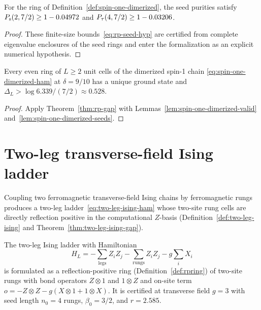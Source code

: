 \begin{lemma}
  \label{lem:spin-one-dimerized-seeds}
  \leanok
  For the ring of Definition~\ref{def:spin-one-dimerized}, the seed purities satisfy
  \(P_{\mathrm{s}}(2, 7/2) \ge 1 - 0.04972\) and \(P_{\tau}(4, 7/2) \ge 1 - 0.03206\).
\end{lemma}
\begin{proof}
  These finite-size bounds~\eqref{eq:rp-seed-hyp} are certified from complete eigenvalue enclosures
  of the seed rings and enter the formalization as an explicit numerical hypothesis.
\end{proof}

\begin{theorem}
  \label{thm:spin-one-dimerized-gap}
  \leanok
  Every even ring of \(L \ge 2\) unit cells of the dimerized spin-1 chain
  \eqref{eq:spin-one-dimerized-ham} at \(\delta = 9/10\) has a unique ground state and
  \(\Delta_L > \log 6.339 / (7/2) \approx 0.528\).
\end{theorem}
\begin{proof}
  \leanok
  Apply Theorem~\ref{thm:rp-gap} with Lemmas~\ref{lem:spin-one-dimerized-valid}
  and~\ref{lem:spin-one-dimerized-seeds}.
\end{proof}

\section{Two-leg transverse-field Ising ladder}

Coupling two ferromagnetic transverse-field Ising chains by ferromagnetic rungs produces a two-leg
ladder~\eqref{eq:two-leg-ising-ham} whose two-site rung cells are directly reflection positive in
the computational \(Z\)-basis (Definition~\ref{def:two-leg-ising} and
Theorem~\ref{thm:two-leg-ising-gap}).

\begin{definition}
  \label{def:two-leg-ising}
  \leanok
  The two-leg Ising ladder with Hamiltonian
  \begin{equation}
    \label{eq:two-leg-ising-ham}
    H_L = -\sum_{\text{legs}} Z_i Z_j - \sum_{\text{rungs}} Z_i Z_j - g \sum_i X_i
  \end{equation}
  is formulated as a reflection-positive ring (Definition~\ref{def:rpring}) of two-site rungs with
  bond operators \(Z \otimes 1\) and \(1 \otimes Z\) and on-site term
  \(o = -Z \otimes Z - g (X \otimes 1 + 1 \otimes X)\). It is certified at transverse field
  \(g = 3\) with seed length \(n_0 = 4\) rungs, \(\beta_0 = 3/2\), and \(r = 2.585\).
\end{definition}

